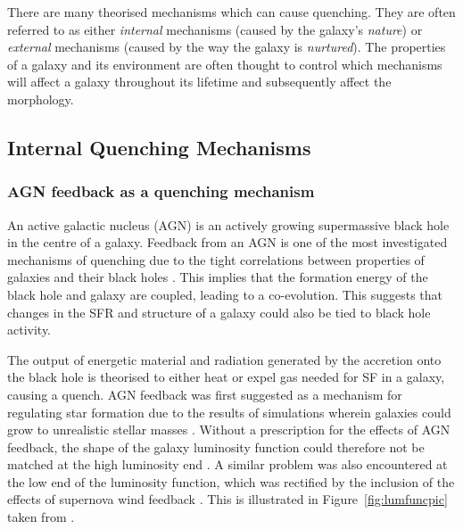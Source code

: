 There are many theorised mechanisms which can cause quenching. They are often referred to as either \emph{internal} mechanisms (caused by the galaxy's \emph{nature}) or \emph{external} mechanisms (caused by the way the galaxy is \emph{nurtured}). The properties of a galaxy and its environment are often thought to control which mechanisms will affect a galaxy throughout its lifetime and subsequently affect the morphology. 

\subsection{Internal Quenching Mechanisms}\label{sec:intquench}

\subsubsection{AGN feedback as a quenching mechanism}\label{sec:agnquench}

An active galactic nucleus (AGN) is an actively growing supermassive black hole in the centre of a galaxy. Feedback from an AGN is one of the most investigated mechanisms of quenching due to the tight correlations between properties of galaxies and their black holes \citep{magorrian98, marconi03, haringrix04}. This implies that the formation energy of the black hole and galaxy are coupled, leading to a co-evolution. This suggests that changes in the SFR and structure of a galaxy could also be tied to  black hole activity. 

The output of energetic material and radiation generated by the accretion onto the black hole is theorised to either heat or expel gas needed for SF in a galaxy, causing a quench. AGN feedback was first suggested as a mechanism for regulating star formation due to the results of simulations wherein galaxies could grow to unrealistic stellar masses \citep{silk98, Bower06, Croton06, somerville08}. Without a prescription for the effects of AGN feedback, the shape of the galaxy luminosity function could therefore not be matched at the high luminosity end \citep{baugh98, baugh05, kauffmann99a, kauffmann99b, somerville01, kitzbichler06}. A similar problem was also encountered at the low end of the luminosity function, which was rectified by the inclusion of the effects of supernova wind feedback \citep{dekel86, powell11}. This is illustrated in Figure~\ref{fig:lumfuncpic} taken from \cite{silk12}. 

